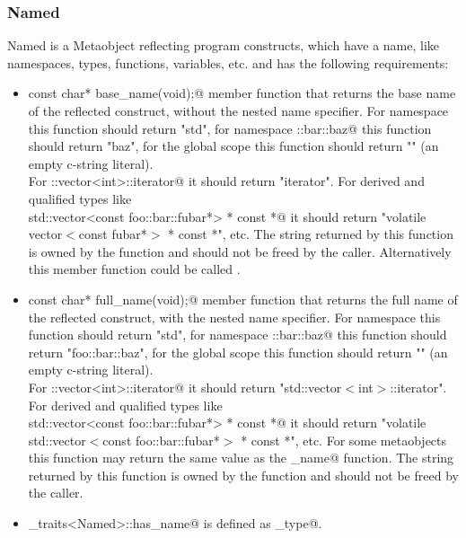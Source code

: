 \subsubsection{Named}

{\metaobject Named} is a {\metaobject Metaobject} reflecting program constructs,
which have a name, like namespaces, types, functions, variables, etc. and has
the following requirements:

\begin{itemize}

	\item{\verb@static const char* base_name(void);@} member function that returns the base name
	of the reflected construct, without the nested name specifier. For namespace
	\verb@std@ this function should return "std", for namespace \verb@foo::bar::baz@
	this function should return "baz", for the global scope this function
	should return "" (an empty c-string literal).\\For \verb@std::vector<int>::iterator@
	it should return "iterator". For derived and qualified types like \\
	\verb@volatile std::vector<const foo::bar::fubar*> * const *@ it should return
	"volatile vector$<$const fubar*$>$ * const *", etc. The string returned by this
	function is owned by the function and should not be freed by the caller. Alternatively 
	this member function could be called \verb@identifier@.

	\item{\verb@static const char* full_name(void);@} member function that returns the full name
	of the reflected construct, with the nested name specifier. For namespace
	\verb@std@ this function should return "std", for namespace \verb@foo::bar::baz@
	this function should return "foo::bar::baz", for the global scope this function
	should return "" (an empty c-string literal).\\For \verb@std::vector<int>::iterator@
	it should return "std::vector$<$int$>$::iterator". For derived and qualified types like\\
	\verb@volatile std::vector<const foo::bar::fubar*> * const *@ it should return
	"volatile std::vector$<$const foo::bar::fubar*$>$ * const *", etc. For some
	metaobjects this function may return the same value as the \verb@base_name@ function.
	The string returned by this function is owned by the function and should not be freed by the caller.
	

	\item \verb@metaobject_traits<Named>::has_name@ is defined as \verb@true_type@.
\end{itemize}

